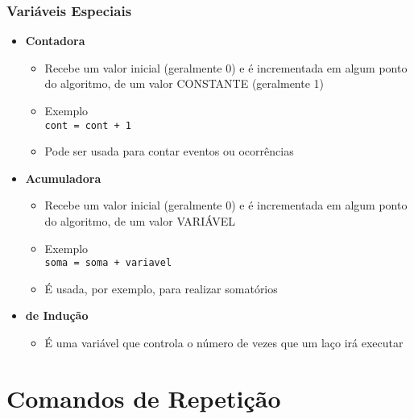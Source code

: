 \documentclass[xcolor={dvipsnames,table},aspectratio=169]{beamer}
\begin{document}
\begin{frame}[fragile]\frametitle{Variáveis Especiais}
\begin{itemize}
	\item \textbf{Contadora}
	\begin{itemize}
		\item Recebe um valor inicial (geralmente 0) e é incrementada em algum ponto do algoritmo, de um valor CONSTANTE (geralmente 1)
		\item Exemplo\\\texttt{cont = cont + 1}
		\item Pode ser usada para contar eventos ou ocorrências
	\end{itemize}
	\item \textbf{Acumuladora}
	\begin{itemize}
		\item Recebe um valor inicial (geralmente 0) e é incrementada em algum ponto do algoritmo, de um valor VARIÁVEL
		\item Exemplo\\\texttt{soma = soma + variavel}
		\item É usada, por exemplo, para realizar somatórios
	\end{itemize}
	\item \textbf{de Indução}
	\begin{itemize}
		\item É uma variável que controla o número de vezes que um laço irá executar
	\end{itemize}
\end{itemize}
\end{frame}

\section{Comandos de Repetição}
\end{document}
